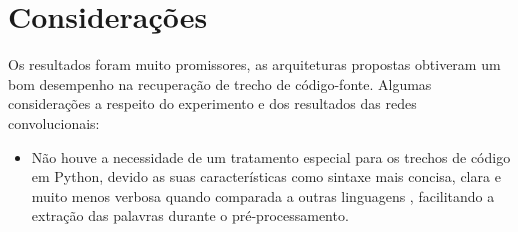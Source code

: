 \section{Considerações}
\label{sec:consideracoes-resultados}

Os resultados foram muito promissores, as arquiteturas propostas obtiveram um bom desempenho na recuperação de trecho de código-fonte. Algumas considerações a respeito do experimento e dos resultados das redes convolucionais:

\begin{itemize}
    \item Não houve a necessidade de um tratamento especial para os trechos de código em Python, devido as suas características como sintaxe mais concisa, clara e muito menos verbosa quando comparada a outras linguagens \citep{theodora-introductory-programming-python-2015}, facilitando a extração das palavras durante o pré-processamento. 
    

\end{itemize}

